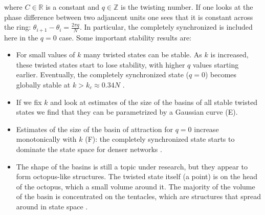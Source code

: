 where $C \in \mathbb{R}$ is a constant and $q \in \mathbb{Z}$ is the twisting number. If one looks at the phase difference between two adjancent units one sees that it is constant across the ring: $\theta_{i+1} - \theta_i = \frac{2\pi q}{N}$. In particular, the completely synchronized is included here in the $q=0$ case. Some important stability results are:
%
\begin{itemize}
    \item For small values of $k$ many twisted states can be stable. As $k$ is increased, these twisted states start to lose stability, with higher $q$ values starting earlier.  Eventually, the completely synchronized state ($q=0$) becomes globally stable at $k>k_c \approx 0.34 N$ \cite{wiley2006the}. 
    \item If we fix $k$ and look at estimates of the size of the basins of all stable twisted states we find that they can be parametrized by a Gaussian curve \cite{wiley2006the, zhang2021basins} (E).
    \item Estimates of the size of the basin of attraction for $q=0$ increase monotonically with $k$ (F): the completely synchronized state starts to dominate the state space for denser networks \cite{wiley2006the}. 
    \item The shape of the basins is still a topic under research, but they appear to form octopus-like structures. The twisted state itself (a point) is on the head of the octopus, which a small volume around it. The majority of the volume of the basin is concentrated on the tentacles, which are structures that spread around in state space \cite{zhang2021basins}.
\end{itemize}


